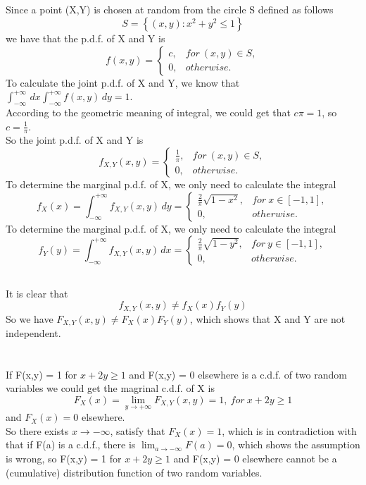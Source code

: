 \documentclass[10.5pt]{article}
\begin{document}
\subsection{}
Since a point (X,Y) is chosen at random from the circle S defined as follows$$S = \left\{(x,y):x^2+y^2\leqslant 1\right\}$$ we have that the p.d.f. of X and Y is $$f(x,y) = \begin{cases}
    c,& for ~(x,y)\in S,\\
    0,& otherwise.
\end{cases}$$\indent
To calculate the joint p.d.f. of X and Y, we know that $\int_{-\infty}^{+\infty} \,dx \int_{-\infty}^{+\infty} f(x,y) \,dy = 1$.\\\indent
According to the geometric meaning of integral, we could get that $c\pi = 1$, so $c=\frac{1}{\pi}$.\\\indent
So the joint p.d.f. of X and Y is $$f_{X,Y}(x,y) = \begin{cases}
    \frac{1}{\pi},& for ~(x,y)\in S,\\
    0,& otherwise.
\end{cases}$$\indent
To determine the marginal p.d.f. of X, we only need to calculate the integral $$f_X(x) = \int_{-\infty}^{+\infty} f_{X,Y}(x,y) \,dy =\begin{cases} 
    \frac{2}{\pi}\sqrt{1-x^2}, & for~x\in[-1,1],\\
    0, & otherwise.
\end{cases}$$\indent
To determine the marginal p.d.f. of X, we only need to calculate the integral $$f_Y(y) = \int_{-\infty}^{+\infty} f_{X,Y}(x,y) \,dx =\begin{cases} 
    \frac{2}{\pi}\sqrt{1-y^2}, & for~y\in[-1,1],\\
    0, & otherwise.
\end{cases}$$\indent
\subsection{}

It is clear that $$f_{X,Y}(x,y) \neq f_X(x) f_Y(y)$$
So we have $F_{X,Y}(x,y) \neq F_X(x)F_Y(y)$, which shows that X and Y are not independent.

\section{}
If F(x,y) = 1 for $x+2y\geqslant 1$ and F(x,y) = 0 elsewhere is a c.d.f. of two random variables we could get the magrinal c.d.f. of X is $$F_X(x) = \lim_{y \to +\infty} F_{X,Y}(x,y) = 1,~for ~x+2y\geqslant 1$$and $F_X(x)=0$ elsewhere.\\\indent
So there exists $x\to -\infty$, satisfy that $F_X(x) = 1$, which is in contradiction with that if F(a) is a c.d.f., there is $\lim_{a\to-\infty}F(a) = 0$, which shows the assumption is wrong, so F(x,y) = 1 for $x+2y\geqslant 1$ and F(x,y) = 0 elsewhere cannot be a (cumulative) distribution function of two random variables.
\end{document}
